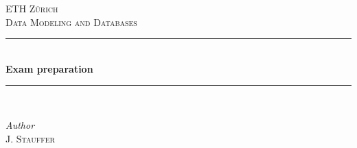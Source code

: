 \begin{titlepage} %
	\newcommand{\HRule}{\rule{\linewidth}{0.5mm}} %
	
	\center %
	
	
	\textsc{\LARGE ETH Zürich}\\[1.5cm] %
	
	\textsc{\Large Data Modeling and Databases}\\[0.5cm] %
	
	
	
	\HRule\\[0.4cm]
	
	{\huge\bfseries Exam preparation}\\[0.4cm] %
	
	\HRule\\[1.5cm]
	
	\begin{minipage}{0.4\textwidth}
		\centering
			\large
			\textit{Author}\\
			J. \textsc{Stauffer} \\
	\end{minipage}
	
	
	
	
	\vfill\vfill\vfill %
	

\end{titlepage}
